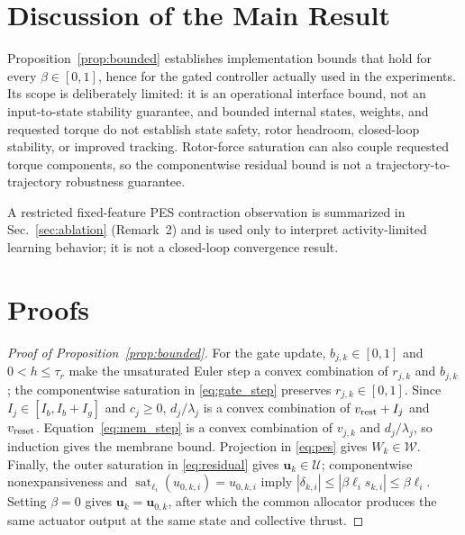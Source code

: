 \documentclass[letterpaper, 10 pt, conference]{ieeeconf}
\newcommand{\sat}{\operatorname{sat}}
\begin{document}
\section{Discussion of the Main Result}
\label{sec:discussion}
Proposition~\ref{prop:bounded} establishes implementation bounds that hold for every $\beta\in[0,1]$, hence for the gated controller actually used in the experiments. Its scope is deliberately limited: it is an operational interface bound, not an input-to-state stability guarantee, and bounded internal states, weights, and requested torque do not establish state safety, rotor headroom, closed-loop stability, or improved tracking. Rotor-force saturation can also couple requested torque components, so the componentwise residual bound is not a trajectory-to-trajectory robustness guarantee.

A restricted fixed-feature PES contraction observation is summarized in Sec.~\ref{sec:ablation} (Remark~2) and is used only to interpret activity-limited learning behavior; it is not a closed-loop convergence result.

\section{Proofs}
\label{sec:proofs}
\begin{proof}[Proof of Proposition~\ref{prop:bounded}]
For the gate update, $b_{j,k}\in[0,1]$ and $0<h\le\tau_r$ make the unsaturated Euler step a convex combination of $r_{j,k}$ and $b_{j,k}$; the componentwise saturation in \eqref{eq:gate_step} preserves $r_{j,k}\in[0,1]$. Since $I_j\in[I_b,I_b+I_g]$ and $c_j\ge0$, $d_j/\lambda_j$ is a convex combination of $v_{\rm rest}+I_j$ and $v_{\rm reset}$. Equation~\eqref{eq:mem_step} is a convex combination of $v_{j,k}$ and $d_j/\lambda_j$, so induction gives the membrane bound. Projection in \eqref{eq:pes} gives $W_k\in\mathcal W$. Finally, the outer saturation in \eqref{eq:residual} gives $\bm u_k\in\mathcal U$; componentwise nonexpansiveness and $\sat_{\ell_i}(u_{0,k,i})=u_{0,k,i}$ imply $|\delta_{k,i}|\le|\beta\ell_i s_{k,i}|\le\beta\ell_i$. Setting $\beta=0$ gives $\bm u_k=\bm u_{0,k}$, after which the common allocator produces the same actuator output at the same state and collective thrust.
\end{proof}
\end{document}
